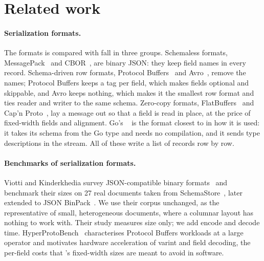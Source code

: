 \section{Related work}
\label{sec:related}

\paragraph{Serialization formats.} The formats \colbin{} is compared with fall
in three groups. Schemaless formats, MessagePack~\cite{msgpack} and
CBOR~\cite{rfc8949}, are binary JSON: they keep field names in every record.
Schema-driven row formats, Protocol Buffers~\cite{protobuf} and
Avro~\cite{avro}, remove the names; Protocol Buffers keeps a tag per field,
which makes fields optional and skippable, and Avro keeps nothing, which makes
it the smallest row format and ties reader and writer to the same schema.
Zero-copy formats, FlatBuffers~\cite{flatbuffers} and Cap'n
Proto~\cite{capnproto}, lay a message out so that a field is read in place,
at the price of fixed-width fields and alignment. Go's
~\cite{gob,pike2011gobs} is the format closest to \colbin{} in how it
is used: it takes its schema from the Go type and needs no compilation, and it
sends type descriptions in the stream. All of these write a list of records
row by row.

\paragraph{Benchmarks of serialization formats.} Viotti and Kinderkhedia
survey JSON-compatible binary formats~\cite{viotti2022survey} and benchmark
their sizes on 27 real documents taken from
SchemaStore~\cite{viotti2022benchmark,schemastore}, later extended to JSON
BinPack~\cite{viotti2022binpack}. We use their corpus unchanged, as the
representative of small, heterogeneous documents, where a columnar layout has
nothing to work with. Their study measures size only; we add encode and decode
time. HyperProtoBench~\cite{karandikar2021protoacc} characterises Protocol
Buffers workloads at a large operator and motivates hardware acceleration of
varint and field decoding, the per-field costs that \colbin{}'s fixed-width
sizes are meant to avoid in software.

